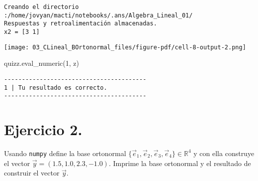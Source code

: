 \documentclass[
  letterpaper,
  DIV=11,
  numbers=noendperiod]{scrreprt}
\newenvironment{Shaded}{\begin{snugshade}}{\end{snugshade}}
\newcommand{\NormalTok}[1]{\textcolor[rgb]{0.00,0.23,0.31}{#1}}
\newcommand{\StringTok}[1]{\textcolor[rgb]{0.13,0.47,0.30}{#1}}
\begin{document}
\begin{verbatim}
Creando el directorio :/home/jovyan/macti/notebooks/.ans/Algebra_Lineal_01/
Respuestas y retroalimentación almacenadas.
x2 = [3 1]
\end{verbatim}

\texttt{[image: 03\_CLineal\_BOrtonormal\_files/figure-pdf/cell-8-output-2.png]}

\begin{Shaded}
\begin{Highlighting}[]
\NormalTok{quizz.eval\_numeric(}\StringTok{\textquotesingle{}1\textquotesingle{}}\NormalTok{, z)}
\end{Highlighting}
\end{Shaded}

\begin{verbatim}
----------------------------------------
1 | Tu resultado es correcto.
----------------------------------------
\end{verbatim}

\section{\texorpdfstring{\textbf{Ejercicio
2.}}{Ejercicio 2.}}\label{ejercicio-2.-1}

Usando \texttt{numpy} define la base ortonormal
\(\{\vec{e}_1, \vec{e}_2, \vec{e}_3, \vec{e}_4\} \in \mathbb{R}^4\) y
con ella construye el vector \(\vec{y} = (1.5, 1.0, 2.3, -1.0)\).
Imprime la base ortonormal y el resultado de construir el vector
\(\vec{y}\).
\end{document}
